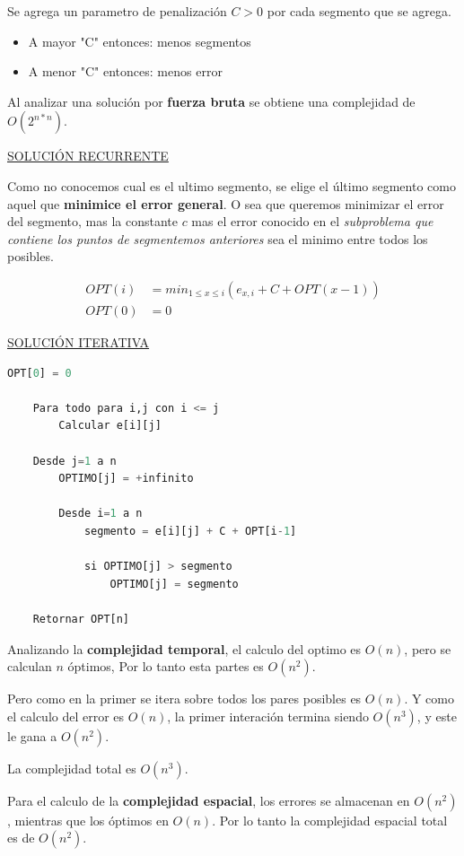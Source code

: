 \documentclass{article}
\begin{document}
Se agrega un parametro de penalización \(C>0\) por cada segmento que se agrega.
\begin{itemize}
    \item A mayor "C" entonces: menos segmentos
    \item A menor "C" entonces: menos error
\end{itemize}

Al analizar una solución por \textbf{fuerza bruta} se obtiene una complejidad de \(O(2^{n*n})\).

\underline{SOLUCIÓN RECURRENTE}

Como no conocemos cual es el ultimo segmento, se elige el último segmento como aquel que \textbf{minimice el error general}.  
O sea que queremos minimizar el error del segmento, mas la constante \(c\) 
mas el error conocido en el \textit{subproblema que contiene los puntos de segmentemos anteriores} 
sea el minimo entre todos los posibles.


\begin{align*}
    OPT(i) &= min_{1 \leq x \leq i} (e_{x,i} + C + OPT(x-1)) \\ 
    OPT(0) &= 0
\end{align*}
    
\noindent
\underline{SOLUCIÓN ITERATIVA}

\begin{lstlisting}[language=Python, caption=Solución iterativa]
    OPT[0] = 0

    Para todo para i,j con i <= j
        Calcular e[i][j]

    Desde j=1 a n
        OPTIMO[j] = +infinito
    
        Desde i=1 a n
            segmento = e[i][j] + C + OPT[i-1]

            si OPTIMO[j] > segmento 
                OPTIMO[j] = segmento

    Retornar OPT[n]

\end{lstlisting}

Analizando la \textbf{complejidad temporal}, el calculo del optimo es \(O(n)\), pero se calculan \(n\) óptimos,
Por lo tanto esta partes es \(O(n^2)\).

Pero como en la primer se itera sobre todos los pares posibles es \(O(n)\). Y como el calculo del error
es \(O(n)\), la primer interación termina siendo \(O(n^3)\), y este le gana a \(O(n^2)\).

La complejidad total es \(O(n^3)\).

Para el calculo de la \textbf{complejidad espacial}, los errores se almacenan en \(O(n^2)\), mientras que 
los óptimos en \(O(n)\). Por lo tanto la complejidad espacial total es de \(O(n^2)\).
\end{document}

